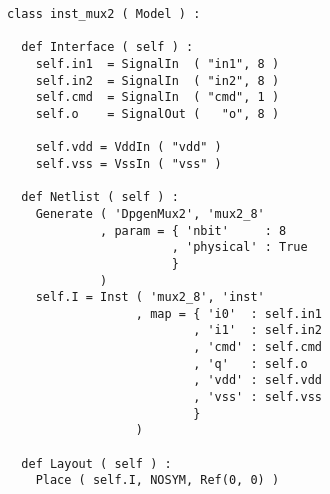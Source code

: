 \begin{itemize}
\begin{verbatim}
class inst_mux2 ( Model ) :

  def Interface ( self ) :
    self.in1  = SignalIn  ( "in1", 8 )
    self.in2  = SignalIn  ( "in2", 8 )
    self.cmd  = SignalIn  ( "cmd", 1 )
    self.o    = SignalOut (   "o", 8 )

    self.vdd = VddIn ( "vdd" )
    self.vss = VssIn ( "vss" )
    
  def Netlist ( self ) :
    Generate ( 'DpgenMux2', 'mux2_8'
             , param = { 'nbit'     : 8
                       , 'physical' : True
                       }
             )
    self.I = Inst ( 'mux2_8', 'inst'
                  , map = { 'i0'  : self.in1
                          , 'i1'  : self.in2
                          , 'cmd' : self.cmd
                          , 'q'   : self.o
                          , 'vdd' : self.vdd
                          , 'vss' : self.vss
                          }
                  )
    
  def Layout ( self ) :
    Place ( self.I, NOSYM, Ref(0, 0) )
\end{verbatim}
\end{itemize}
